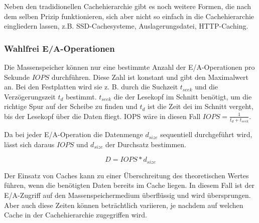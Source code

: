 Neben den tradidionellen Cachehierarchie gibt es noch weitere Formen, die nach dem selben Prizip funktionieren, sich aber nicht so einfach in die Cachehierarchie eingliedern lassen, z.B. SSD-Cachesysteme, Auslagerungsdatei, HTTP-Caching.

\subsubsection{Wahlfrei E/A-Operationen}
Die Massenspeicher können nur eine bestimmte Anzahl der E/A-Operationen pro Sekunde $IOPS$ durchführen. Diese Zahl ist konstant und gibt den Maximalwert an. Bei den Festplatten wird sie z. B. durch die Suchzeit $t_{seek}$ und die Verzögerungszeit $t_{d}$ bestimmt. $t_{seek}$ die der Lesekopf im Schnitt benötigt, um die richtige Spur auf der Scheibe zu finden und $t_d$ ist die Zeit dei im Schnitt vergeht, bis der Lesekopf über die Daten fliegt. IOPS wäre in diesen Fall $IOPS = \frac{1}{t_d + t_{seek}}$.

Da bei jeder E/A-Operation die Datenmenge $d_{size}$ sequentiell durchgeführt wird, lässt sich daraus $IOPS$ und $d_{size}$ der Durchsatz bestimmen.

\begin{equation}
	D = IOPS * d_{size}
\end{equation}

Der Einsatz von Caches kann zu einer Überschreitung des theoretischen Wertes führen, wenn die benötigten Daten bereits im Cache liegen. In diesem Fall ist der E/A-Zugriff auf den Massenspeichermedium überflüssig und wird übersprungen. Aber auch diese Zeiten können beträchtlich variieren, je nachdem auf welchen Cache in der Cachehierarchie zugegriffen wird. 






\bigskip

\textit{}

